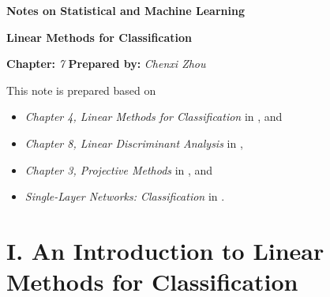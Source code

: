 \documentclass[12pt]{article}
\newcommand{\titlebox}[4]{
\begin{tcolorbox}[colback = blue!5!white!95, colframe = blue!70!black
]
  \noindent \textbf{ #1 } \hfill \textit{#2} 
  \begin{center}
  	 \LARGE{\textbf{#3}}
  \end{center}
\textbf{Chapter:} \textit{#4} \hfill \textbf{Prepared by:} \textit{Chenxi Zhou}
\end{tcolorbox}
}
\begin{document}
\titlebox{Notes on Statistical and Machine Learning}{}{Linear Methods for Classification}{7}
\thispagestyle{plain}

\vspace{10pt}

This note is prepared based on 
\begin{itemize}
	\item \textit{Chapter 4, Linear Methods for Classification} in \textcite{Friedman2001-np}, and 
	\item \textit{Chapter 8, Linear Discriminant Analysis} in \textcite{Izenman2009-jk},  
	\item \textit{Chapter 3, Projective Methods} in \textcite{Burges2010-jc}, and 
	\item \textit{Single-Layer Networks: Classification} in \textcite{Bishop2023-dl}. 
\end{itemize}

\section*{I. An Introduction to Linear Methods for Classification} 
\end{document}
